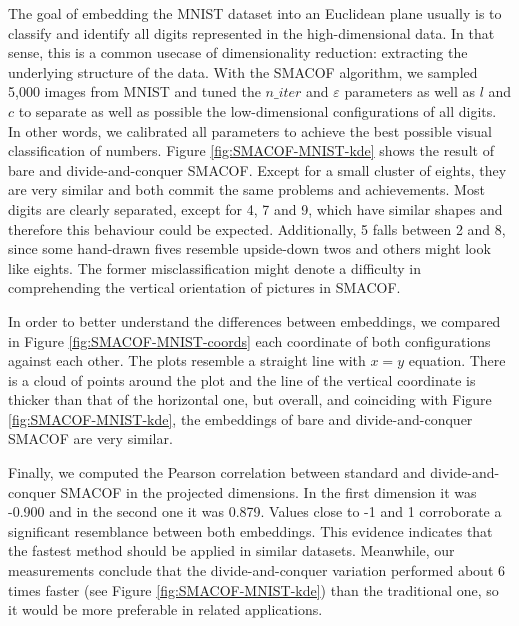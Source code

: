 The goal of embedding the MNIST dataset into an Euclidean plane usually is to classify and identify all digits represented in the high-dimensional data. In that sense, this is a common usecase of dimensionality reduction: extracting the underlying structure of the data. With the SMACOF algorithm, we sampled 5,000 images from MNIST and tuned the $n\_iter$ and $\varepsilon$ parameters as well as $l$ and $c$ to separate as well as possible the low-dimensional configurations of all digits. In other words, we calibrated all parameters to achieve the best possible visual classification of numbers. Figure \ref{fig:SMACOF-MNIST-kde} shows the result of bare and divide-and-conquer SMACOF. Except for a small cluster of eights, they are very similar and both commit the same problems and achievements. Most digits are clearly separated, except for 4, 7 and 9, which have similar shapes and therefore this behaviour could be expected. Additionally, 5 falls between 2 and 8, since some hand-drawn fives resemble upside-down twos and others might look like eights. The former misclassification might denote a difficulty in comprehending the vertical orientation of pictures in SMACOF.

In order to better understand the differences between embeddings, we compared in Figure \ref{fig:SMACOF-MNIST-coords} each coordinate of both configurations against each other. The plots resemble a straight line with $x=y$ equation. There is a cloud of points around the plot and the line of the vertical coordinate is thicker than that of the horizontal one, but overall, and coinciding with Figure \ref{fig:SMACOF-MNIST-kde}, the embeddings of bare and divide-and-conquer SMACOF are very similar.

Finally, we computed the Pearson correlation between standard and divide-and-conquer SMACOF in the projected dimensions. In the first dimension it was -0.900 and in the second one it was 0.879. Values close to -1 and 1 corroborate a significant resemblance between both embeddings. This evidence indicates that the fastest method should be applied in similar datasets. Meanwhile, our measurements conclude that the divide-and-conquer variation performed about 6 times faster (see Figure \ref{fig:SMACOF-MNIST-kde}) than the traditional one, so it would be more preferable in related applications.

